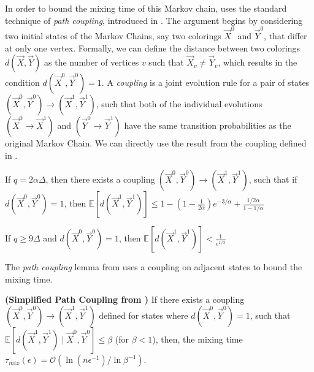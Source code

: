 In order to bound the mixing time of this Markov chain,
\cite{ghaffari_fischer} uses the standard technique of \emph{path coupling}, introduced in \cite{path_coupling}.
The argument begins by considering two initial states of the Markov Chains, say two colorings $\vec X^0$ and $\vec Y^0$,
that differ at only one vertex.
Formally, we can define the distance between two colorings $d(\vec X,\vec Y)$ as the number of vertices $v$ such that $\vec X_v\not= \vec Y_v$,
which results in the condition $d(\vec X^0, \vec Y^0) = 1$.
A \emph{coupling} is a joint evolution rule for a pair of states $(\vec X^0,\vec Y^0)\rightarrow(\vec X^1,\vec Y^1)$,
such that both of the individual evolutions $(\vec X^0\rightarrow \vec X^1)$ and $(\vec Y^0\rightarrow \vec Y^1)$
have the same transition probabilities as the original Markov Chain.
We can directly use the result from the coupling defined in \cite{ghaffari_fischer}.
\begin{lemma}
\label{lem:ghaffari_fischer_single_epoch_distance}
If $q = 2\alpha\Delta$, then there exists a coupling $(\vec X^0,\vec Y^0)\rightarrow(\vec X^1,\vec Y^1)$, such that if $d(\vec X^0, \vec Y^0) = 1$,
then $\mathbb E[d(\vec X^1,\vec Y^1)] \le 1-\left( 1-\frac1{2\alpha}\right)e^{-3/\alpha} + \frac{1/2\alpha}{1-1/\alpha}$
\end{lemma}
\begin{corollary}
\label{cor:single_epoch_distansce}
If $q \ge 9\Delta$ and $d(\vec X^0, \vec Y^0) = 1$, then $\mathbb E[d(\vec X^1,\vec Y^1)] < \frac1{e^{1/3}}$
\end{corollary}

The \emph{path coupling} lemma from \cite{path_coupling} uses a coupling on adjacent states to bound the mixing time.
\begin{lemma}
\label{lem:path_coupling}
\textbf{(Simplified Path Coupling from \cite{path_coupling})}
If there exists a coupling $(\vec X^0,\vec Y^0)\rightarrow(\vec X^1,\vec Y^1)$ defined for states where $d(\vec X^0, \vec Y^0) = 1$,
such that $\mathbb{E}[d(\vec X^1, \vec Y^1) \mid \vec X^0, \vec Y^0] \le \beta$ (for $\beta < 1$),
then, the mixing time $\tau_{mix}(\epsilon) = \mathcal O(\ln (n\epsilon^{-1})/\ln \beta^{-1})$.
\end{lemma}

